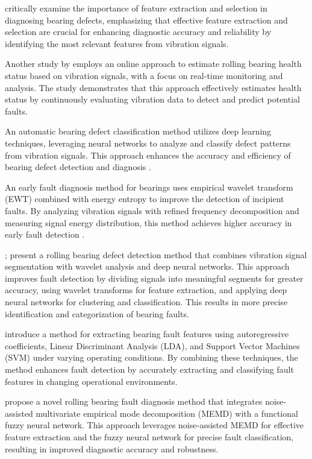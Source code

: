 \documentclass[sn-basic,pdflatex]{sn-jnl}
\theoremstyle{remark}
\theoremstyle{definition}
\begin{document}
\citet{WOS:000458657500187} critically examine the importance of feature
extraction and selection in diagnosing bearing defects, emphasizing that
effective feature extraction and selection are crucial for enhancing
diagnostic accuracy and reliability by identifying the most relevant
features from vibration signals.

Another study by \citet{WOS:000452922000015} employs an online approach
to estimate rolling bearing health status based on vibration signals,
with a focus on real-time monitoring and analysis. The study
demonstrates that this approach effectively estimates health status by
continuously evaluating vibration data to detect and predict potential
faults.

An automatic bearing defect classification method utilizes deep learning
techniques, leveraging neural networks to analyze and classify defect
patterns from vibration signals. This approach enhances the accuracy and
efficiency of bearing defect detection and diagnosis
\citep{WOS:000453413600001}.

An early fault diagnosis method for bearings uses empirical wavelet
transform (EWT) combined with energy entropy to improve the detection of
incipient faults. By analyzing vibration signals with refined frequency
decomposition and measuring signal energy distribution, this method
achieves higher accuracy in early fault detection
\citep{WOS:000452819600235}.

\citet{WOS:000450745100001}; \citet{WOS:000449334500118} present a
rolling bearing defect detection method that combines vibration signal
segmentation with wavelet analysis and deep neural networks. This
approach improves fault detection by dividing signals into meaningful
segments for greater accuracy, using wavelet transforms for feature
extraction, and applying deep neural networks for clustering and
classification. This results in more precise identification and
categorization of bearing faults.

\citet{WOS:000440977000032} introduce a method for extracting bearing
fault features using autoregressive coefficients, Linear Discriminant
Analysis (LDA), and Support Vector Machines (SVM) under varying
operating conditions. By combining these techniques, the method enhances
fault detection by accurately extracting and classifying fault features
in changing operational environments.

\citet{WOS:000434717400001} propose a novel rolling bearing fault
diagnosis method that integrates noise-assisted multivariate empirical
mode decomposition (MEMD) with a functional fuzzy neural network. This
approach leverages noise-assisted MEMD for effective feature extraction
and the fuzzy neural network for precise fault classification, resulting
in improved diagnostic accuracy and robustness.
\end{document}
